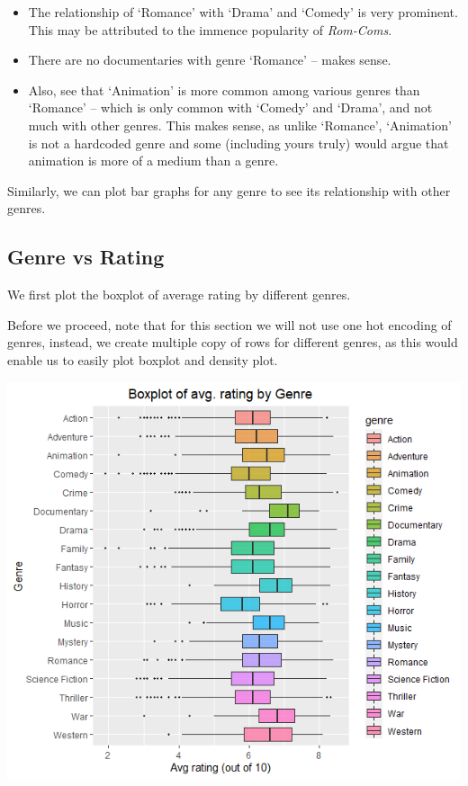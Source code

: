 \documentclass[10pt]{article}
\begin{document}
\begin{multicols}{2}
\begin{itemize}
    \item The relationship of `Romance' with `Drama' and `Comedy' is very prominent. 
    This may be attributed to the immence popularity of \emph{Rom-Coms}.
    \item There are no documentaries with genre `Romance' -- makes sense.
    \item Also, see that `Animation' is more common among various genres than 
    `Romance' -- which is only common with `Comedy' and `Drama', and not much with other genres.
    This makes sense, as unlike `Romance', `Animation' is not a hardcoded genre 
    and some (including yours truly) would argue that animation is more of a medium than a genre. 
\end{itemize}

Similarly, we can plot bar graphs for any genre to see its relationship with other genres.

\subsection{Genre vs Rating}

We first plot the boxplot of average rating by different genres. 

Before we proceed, note that for this section we will not use one hot encoding of genres, instead, we create multiple copy of rows for different genres, as this would enable us to easily plot boxplot and density plot.

\includegraphics[scale=0.5]{boxplot_rating_genre.png}


\end{multicols}
\end{document}
